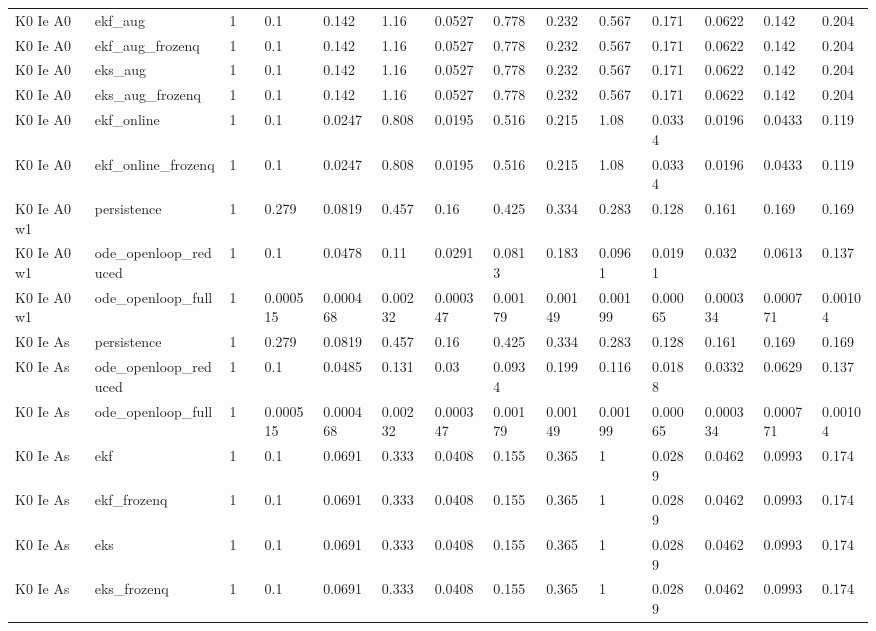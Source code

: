 \begin{table}[t]
\begin{tabular}{lllllllllllllll}
K0 Ie A0 & ekf\_aug & 1 &  & 0.1 & 0.142 & 1.16 & 0.0527 & 0.778 & 0.232 & 0.567 & 0.171 & 0.0622 & 0.142 & 0.204 \\
K0 Ie A0 & ekf\_aug\_frozenq & 1 &  & 0.1 & 0.142 & 1.16 & 0.0527 & 0.778 & 0.232 & 0.567 & 0.171 & 0.0622 & 0.142 & 0.204 \\
K0 Ie A0 & eks\_aug & 1 &  & 0.1 & 0.142 & 1.16 & 0.0527 & 0.778 & 0.232 & 0.567 & 0.171 & 0.0622 & 0.142 & 0.204 \\
K0 Ie A0 & eks\_aug\_frozenq & 1 &  & 0.1 & 0.142 & 1.16 & 0.0527 & 0.778 & 0.232 & 0.567 & 0.171 & 0.0622 & 0.142 & 0.204 \\
K0 Ie A0 & ekf\_online & 1 &  & 0.1 & 0.0247 & 0.808 & 0.0195 & 0.516 & 0.215 & 1.08 & 0.0334 & 0.0196 & 0.0433 & 0.119 \\
K0 Ie A0 & ekf\_online\_frozenq & 1 &  & 0.1 & 0.0247 & 0.808 & 0.0195 & 0.516 & 0.215 & 1.08 & 0.0334 & 0.0196 & 0.0433 & 0.119 \\
K0 Ie A0 w1 & persistence & 1 &  & 0.279 & 0.0819 & 0.457 & 0.16 & 0.425 & 0.334 & 0.283 & 0.128 & 0.161 & 0.169 & 0.169 \\
K0 Ie A0 w1 & ode\_openloop\_reduced & 1 &  & 0.1 & 0.0478 & 0.11 & 0.0291 & 0.0813 & 0.183 & 0.0961 & 0.0191 & 0.032 & 0.0613 & 0.137 \\
K0 Ie A0 w1 & ode\_openloop\_full & 1 &  & 0.000515 & 0.000468 & 0.00232 & 0.000347 & 0.00179 & 0.00149 & 0.00199 & 0.00065 & 0.000334 & 0.000771 & 0.00104 \\
K0 Ie As & persistence & 1 &  & 0.279 & 0.0819 & 0.457 & 0.16 & 0.425 & 0.334 & 0.283 & 0.128 & 0.161 & 0.169 & 0.169 \\
K0 Ie As & ode\_openloop\_reduced & 1 &  & 0.1 & 0.0485 & 0.131 & 0.03 & 0.0934 & 0.199 & 0.116 & 0.0188 & 0.0332 & 0.0629 & 0.137 \\
K0 Ie As & ode\_openloop\_full & 1 &  & 0.000515 & 0.000468 & 0.00232 & 0.000347 & 0.00179 & 0.00149 & 0.00199 & 0.00065 & 0.000334 & 0.000771 & 0.00104 \\
K0 Ie As & ekf & 1 &  & 0.1 & 0.0691 & 0.333 & 0.0408 & 0.155 & 0.365 & 1 & 0.0289 & 0.0462 & 0.0993 & 0.174 \\
K0 Ie As & ekf\_frozenq & 1 &  & 0.1 & 0.0691 & 0.333 & 0.0408 & 0.155 & 0.365 & 1 & 0.0289 & 0.0462 & 0.0993 & 0.174 \\
K0 Ie As & eks & 1 &  & 0.1 & 0.0691 & 0.333 & 0.0408 & 0.155 & 0.365 & 1 & 0.0289 & 0.0462 & 0.0993 & 0.174 \\
K0 Ie As & eks\_frozenq & 1 &  & 0.1 & 0.0691 & 0.333 & 0.0408 & 0.155 & 0.365 & 1 & 0.0289 & 0.0462 & 0.0993 & 0.174 \\

\end{tabular}
\end{table}
